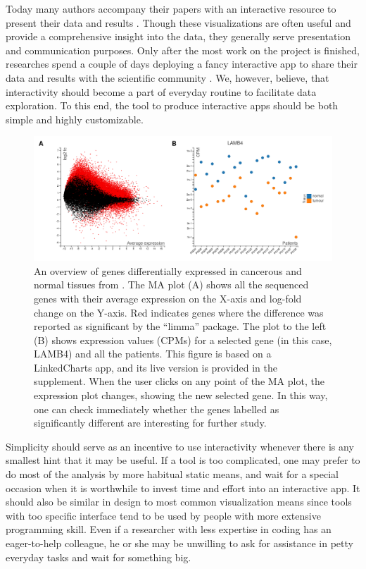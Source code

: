\documentclass[twocolumn,10pt]{article}
\begin{document}
Today many authors accompany their papers with an interactive resource to present their data and results \citep{travaglini_2020, roider_2020, kalucka_2020}. Though these visualizations are often useful and provide a comprehensive insight into the data, they generally serve presentation and communication purposes. Only after the most work on the project is finished, researches spend a couple of days deploying a fancy interactive app to share their data and results with the scientific community \citep{batch_2017}. We, however, believe, that interactivity should become a part of everyday routine to facilitate data exploration. To this end, the tool to produce interactive apps should be both simple and highly customizable.

\begin{figure}[b]
	\includegraphics[width=\textwidth]{FigD/figD.png}
	\caption{An overview of genes differentially expressed in cancerous and normal tissues from \citet{conway_2015}. The MA plot (A) shows all the sequenced genes with their average expression on the X-axis and log-fold change on the Y-axis. Red indicates genes where the difference was reported as significant by the ``limma''  \citep{ritchie_2015}  package. The plot to the left (B) shows expression values (CPMs) for a selected gene (in this case, LAMB4) and all the patients. This figure is based on a LinkedCharts app, and its live version is provided in the supplement. When the user clicks on any point of the MA plot, the expression plot changes, showing the new selected gene. In this way, one can check immediately whether the genes labelled as significantly different are interesting for further study.}  
	\label{FigD}
\end{figure}

Simplicity should serve as an incentive to use interactivity whenever there is any smallest hint that it may be useful. If a tool is too complicated, one may prefer to do most of the analysis by more habitual static means, and wait for a special occasion when it is worthwhile to invest time and effort into an interactive app. It should also be similar in design to most common visualization means since tools with too specific interface tend to be used by people with more extensive programming skill. Even if a researcher with less expertise in coding has an eager-to-help colleague, he or she may be unwilling to ask for assistance in petty everyday tasks and wait for something big.
\end{document}

